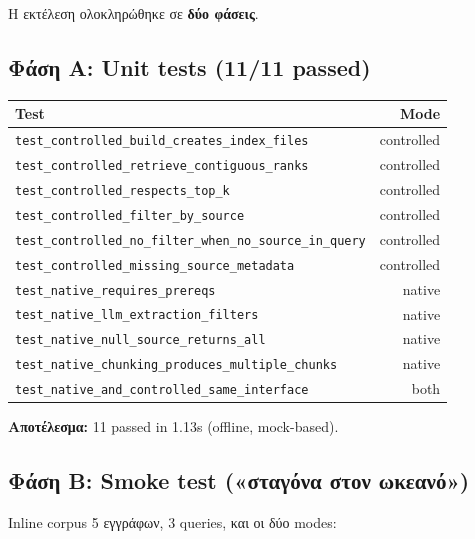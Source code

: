 \documentclass[11pt,a4paper]{article}
\begin{document}
Η εκτέλεση ολοκληρώθηκε σε \textbf{δύο φάσεις}.

\subsection*{Φάση Α: Unit tests (11/11 passed)}

\begin{center}
\small
\begin{tabular}{@{}lr@{}}
\toprule
\textbf{Test} & \textbf{Mode} \\
\midrule
\texttt{test\_controlled\_build\_creates\_index\_files} & controlled \\
\texttt{test\_controlled\_retrieve\_contiguous\_ranks} & controlled \\
\texttt{test\_controlled\_respects\_top\_k} & controlled \\
\texttt{test\_controlled\_filter\_by\_source} & controlled \\
\texttt{test\_controlled\_no\_filter\_when\_no\_source\_in\_query} & controlled \\
\texttt{test\_controlled\_missing\_source\_metadata} & controlled \\
\texttt{test\_native\_requires\_prereqs} & native \\
\texttt{test\_native\_llm\_extraction\_filters} & native \\
\texttt{test\_native\_null\_source\_returns\_all} & native \\
\texttt{test\_native\_chunking\_produces\_multiple\_chunks} & native \\
\texttt{test\_native\_and\_controlled\_same\_interface} & both \\
\bottomrule
\end{tabular}
\end{center}

\textbf{Αποτέλεσμα:} 11 passed in 1.13s (offline, mock-based).

\subsection*{Φάση Β: Smoke test («σταγόνα στον ωκεανό»)}

Inline corpus 5 εγγράφων, 3 queries, και οι δύο modes:
\end{document}
